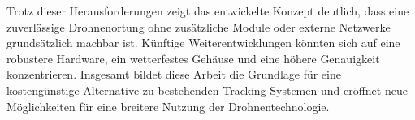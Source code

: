 Trotz dieser Herausforderungen zeigt das entwickelte Konzept deutlich, dass eine zuverlässige Drohnenortung ohne zusätzliche Module oder externe Netzwerke grundsätzlich machbar ist. Künftige Weiterentwicklungen könnten sich auf eine robustere Hardware, ein wetterfestes Gehäuse und eine höhere Genauigkeit konzentrieren. Insgesamt bildet diese Arbeit die Grundlage für eine kostengünstige Alternative zu bestehenden Tracking-Systemen und eröffnet neue Möglichkeiten für eine breitere Nutzung der Drohnentechnologie.

